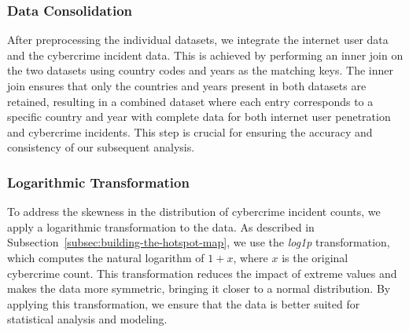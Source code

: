     \subsubsection{Data Consolidation} %
        After preprocessing the individual datasets, we integrate the internet user data and the cybercrime incident data.
        This is achieved by performing an inner join on the two datasets using country codes and years as the matching keys.
        The inner join ensures that only the countries and years present in both datasets are retained,
        resulting in a combined dataset where each entry corresponds to a specific country and year with complete data
        for both internet user penetration and cybercrime incidents.
        This step is crucial for ensuring the accuracy and consistency of our subsequent analysis.

    \subsubsection{Logarithmic Transformation} %
        To address the skewness in the distribution of cybercrime incident counts,
        we apply a logarithmic transformation to the data.
        As described in Subsection~\ref{subsec:building-the-hotspot-map},
        we use the \textit{log1p} transformation, which computes the natural logarithm of \(1 + x\),
        where \(x\) is the original cybercrime count.
        This transformation reduces the impact of extreme values and makes the data more symmetric,
        bringing it closer to a normal distribution.
        By applying this transformation, we ensure that the data is better suited for statistical analysis and modeling.
